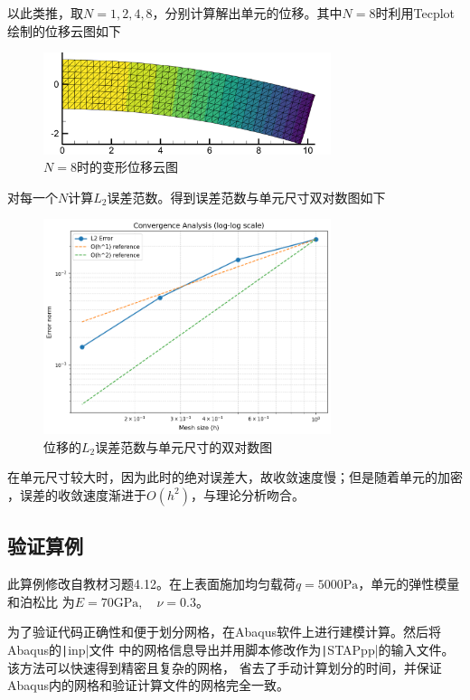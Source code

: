 \documentclass[12pt,a4paper]{article}
\newcommand{\code}{\texttt}
\begin{document}
以此类推，取$N=1,2,4,8$，分别计算解出单元的位移。其中$N=8$时利用Tecplot绘制的位移云图如下
\begin{figure}[H]
    \centering
    \includegraphics[width=0.75\textwidth]{cloud_map.png}
    \caption{$N=8$时的变形位移云图}
\end{figure}

对每一个$N$计算$L_2$误差范数。得到误差范数与单元尺寸双对数图如下
\begin{figure}[H]
    \centering
    \includegraphics[width=0.75\textwidth]{log.png}
    \caption{位移的$L_2$误差范数与单元尺寸的双对数图}
\end{figure}

在单元尺寸较大时，因为此时的绝对误差大，故收敛速度慢；但是随着单元的加密
，误差的收敛速度渐进于$O(h^2)$，与理论分析吻合。

\subsection{验证算例}
此算例修改自教材习题4.12\cite{zhang2003}。在上表面施加均匀载荷$q=5000\mathrm{Pa}$，单元的弹性模量和泊松比
为$E=70\mathrm{GPa},\quad\nu=0.3$。

为了验证代码正确性和便于划分网格，在Abaqus软件上进行建模计算。然后将Abaqus的\code|inp|文件
中的网格信息导出并用脚本修改作为\code|STAPpp|的输入文件。该方法可以快速得到精密且复杂的网格，
省去了手动计算划分的时间，并保证Abaqus内的网格和验证计算文件的网格完全一致。
\end{document}
